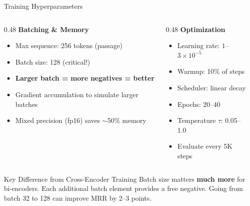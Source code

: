 \documentclass[aspectratio=169]{beamer}
\newif\ifanimated
\newcommand{\cpause}{\ifanimated\pause\fi}
\begin{document}
\begin{frame}{Training Hyperparameters}
\begin{columns}
\begin{column}{0.48\textwidth}
\textbf{Batching \& Memory}
\begin{itemize}
    \item Max sequence: 256 tokens (passage)
    \item Batch size: 128 (critical!)
    \item \textbf{Larger batch = more negatives = better}
    \item Gradient accumulation to simulate larger batches
    \item Mixed precision (fp16) saves $\sim$50\% memory
\end{itemize}
\end{column}

\begin{column}{0.48\textwidth}
\textbf{Optimization}
\begin{itemize}
    \item Learning rate: $1$--$3 \times 10^{-5}$
    \item Warmup: 10\% of steps
    \item Scheduler: linear decay
    \item Epochs: 20--40
    \item Temperature $\tau$: 0.05--1.0
    \item Evaluate every 5K steps
\end{itemize}
\end{column}
\end{columns}

\cpause
\vspace{1em}

\begin{alertblock}{Key Difference from Cross-Encoder Training}
Batch size matters \textbf{much more} for bi-encoders. Each additional batch element provides a free negative. Going from batch 32 to 128 can improve MRR by 2--3 points.
\end{alertblock}
\end{frame}
\end{document}

